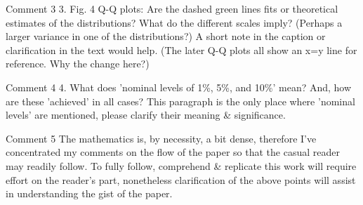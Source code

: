 \documentclass[11pt]{report}
\begin{document}
\begin{reviewbox}{Comment 3}
3. Fig. 4 Q-Q plots: Are the dashed green lines fits or theoretical estimates of the distributions? What do the different scales imply? (Perhaps a larger variance in one of the distributions?) A short note in the caption or clarification in the text would help. (The later Q-Q plots all show an x=y line for reference. Why the change here?)
\end{reviewbox}

\begin{reviewbox}{Comment 4}
4. What does 'nominal levels of 1\%, 5\%, and 10\%' mean? And, how are these 'achieved' in all cases? This paragraph is the only place where 'nominal levels' are mentioned, please clarify their meaning \& significance.
\end{reviewbox}

\begin{reviewbox}{Comment 5}
The mathematics is, by necessity, a bit dense, therefore I've concentrated my comments on the flow of the paper so that the casual reader may readily follow. To fully follow, comprehend \& replicate this work will require effort on the reader's part, nonetheless clarification of the above points will assist in understanding the gist of the paper. 
\end{reviewbox}
\end{document}
